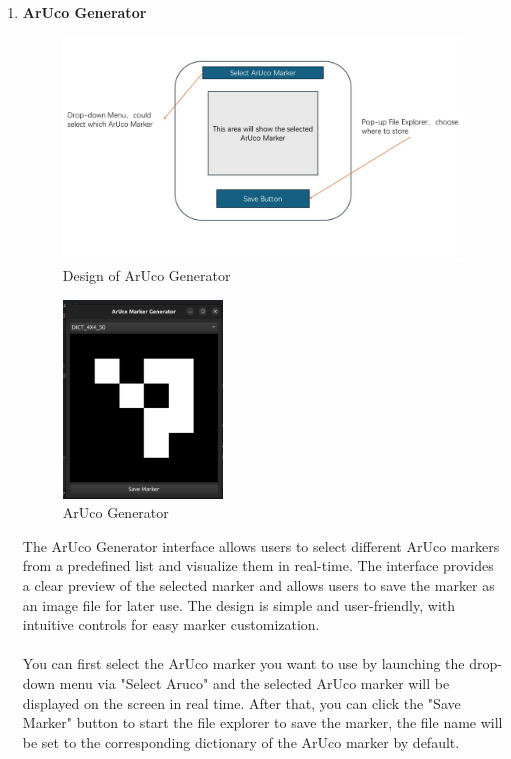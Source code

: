\documentclass[12pt]{article}
\begin{document}
\begin{enumerate}
\begin{enumerate}
                  \item \textbf{ArUco Generator}
                        \begin{figure}[H]
                              \centering
                              \includegraphics[width=1.2\textwidth]{design_generator.jpg}
                              \caption{Design of ArUco Generator}
                        \end{figure}
                        \begin{figure}[H]
                              \centering
                              \includegraphics[width=0.4\textwidth]{main_arucuo.png}
                              \caption{ArUco Generator}
                        \end{figure}
                        The ArUco Generator interface allows users to select different ArUco markers from a predefined list and visualize them in real-time.
                        The interface provides a clear preview of the selected marker and allows users to save the marker as an image file for later use.
                        The design is simple and user-friendly, with intuitive controls for easy marker customization.
                        \\\\
                        You can first select the ArUco marker you want to use by launching the drop-down menu via "Select Aruco" and the selected ArUco marker will be displayed on the screen in real time. After that, you can click the "Save Marker" button to start the file explorer to save the marker, the file name will be set to the corresponding dictionary of the ArUco marker by default.


\end{enumerate}
\end{enumerate}
\end{document}
